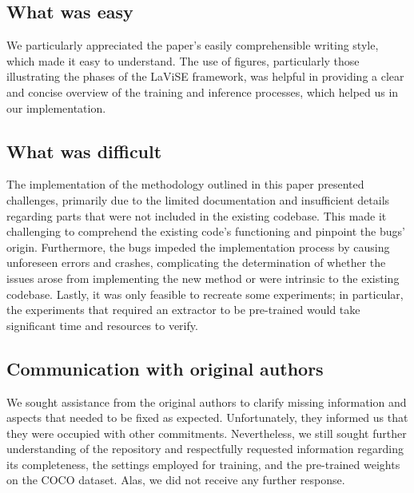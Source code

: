 \subsection{What was easy} \label{sec:What was easy}
We particularly appreciated the paper's easily comprehensible writing style, which made it easy to understand. The use of figures, particularly those illustrating the phases of the LaViSE framework, was helpful in providing a clear and concise overview of the training and inference processes, which helped us in our implementation.

\subsection{What was difficult} \label{sec:What was difficult}
The implementation of the methodology outlined in this paper presented challenges, primarily due to the limited documentation and insufficient details regarding parts that were not included in the existing codebase. This made it challenging to comprehend the existing code's functioning and pinpoint the bugs' origin. Furthermore, the bugs impeded the implementation process by causing unforeseen errors and crashes, complicating the determination of whether the issues arose from implementing the new method or were intrinsic to the existing codebase. Lastly, it was only feasible to recreate some experiments; in particular, the experiments that required an extractor to be pre-trained would take significant time and resources to verify.

\subsection{Communication with original authors} \label{sec:Communication with original authors}
We sought assistance from the original authors to clarify missing information and aspects that needed to be fixed as expected. Unfortunately, they informed us that they were occupied with other commitments. Nevertheless, we still sought further understanding of the repository and respectfully requested information regarding its completeness, the settings employed for training, and the pre-trained weights on the COCO dataset. Alas, we did not receive any further response.
